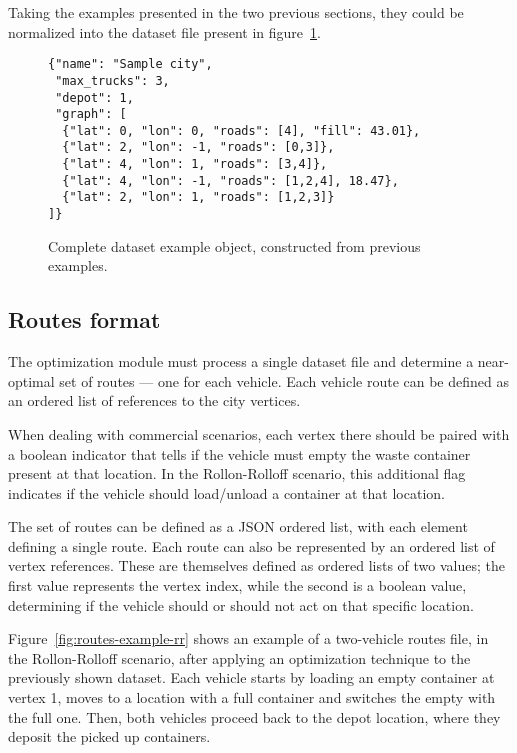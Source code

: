 Taking the examples presented in the two previous sections, they could be
normalized into the dataset file present in figure~\ref{fig:dataset-example}.

\begin{figure}[th]
  \begin{center}
    \leavevmode
      \begin{minipage}{12cm}
    \begin{verbatim}
{"name": "Sample city",
 "max_trucks": 3,
 "depot": 1,
 "graph": [
  {"lat": 0, "lon": 0, "roads": [4], "fill": 43.01},
  {"lat": 2, "lon": -1, "roads": [0,3]},
  {"lat": 4, "lon": 1, "roads": [3,4]},
  {"lat": 4, "lon": -1, "roads": [1,2,4], 18.47},
  {"lat": 2, "lon": 1, "roads": [1,2,3]}
]}
    \end{verbatim}
    \end{minipage}
    \caption{Complete dataset example object, constructed from previous examples.}
    \label{fig:dataset-example}
  \end{center}
\end{figure}





\subsection{Routes format}
\label{section:routes-format}

The optimization module must process a single dataset file and determine a
near-optimal set of routes --- one for each vehicle. Each vehicle route can be
defined as an ordered list of references to the city vertices.

When dealing with commercial scenarios, each vertex there should be paired with
a boolean indicator that tells if the vehicle must empty the waste container
present at that location. In the Rollon-Rolloff scenario, this additional
flag indicates if the vehicle should load/unload a container at that location.

The set of routes can be defined as a JSON ordered list, with each element
defining a single route. Each route can also be represented by an ordered list
of vertex references. These are themselves defined as ordered lists of two
values; the first value represents the vertex index, while the second is a
boolean value, determining if the vehicle should or should not act on that
specific location.

Figure~\ref{fig:routes-example-rr} shows an example of a two-vehicle routes
file, in the Rollon-Rolloff scenario, after applying an optimization technique
to the previously shown dataset. Each vehicle starts by loading an empty
container at vertex 1, moves to a location with a full container and switches
the empty with the full one. Then, both vehicles proceed back to the depot
location, where they deposit the picked up containers.

